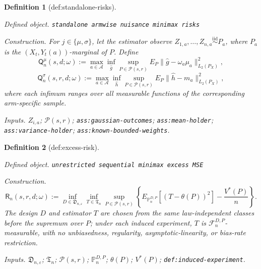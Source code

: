 \documentclass{article}
\newtheorem{definition}{Definition}
\begin{document}
\begin{definition}[def:standalone-risks]\label{def:standalone-risks}
\par\smallskip\noindent\emph{Defined object.} \texttt{standalone armwise nuisance minimax risks}
\par\smallskip\noindent\emph{Construction.} For \(j\in\{\mu,\sigma\}\), let the estimator observe \(Z_{1,a},\ldots,Z_{n,a}\stackrel{\mathrm{iid}}{\sim}P_a\), where \(P_a\) is the \((X_t,Y_t(a))\)-marginal of \(P\). Define \[\mathsf Q_n^{\mu}(s,d;\omega):=\max_{a\in\mathcal A}\inf_{\widehat g}\sup_{P\in\mathcal P(s,r)}E_P\|\widehat g-\omega_a\mu_a\|_{L_2(P_X)}^2,\] \[\mathsf Q_n^{\sigma}(s,r,d;\omega):=\max_{a\in\mathcal A}\inf_{\widehat h}\sup_{P\in\mathcal P(s,r)}E_P\|\widehat h-m_a\|_{L_2(P_X)}^2,\] where each infimum ranges over all measurable functions of the corresponding arm-specific sample.
\par\smallskip\noindent\emph{Inputs.} \(Z_{i,a}\); \(\mathcal P(s,r)\); \texttt{ass:\allowbreak{}gaussian-\allowbreak{}outcomes}; \texttt{ass:\allowbreak{}mean-\allowbreak{}holder}; \texttt{ass:\allowbreak{}variance-\allowbreak{}holder}; \texttt{ass:\allowbreak{}known-\allowbreak{}bounded-\allowbreak{}weights}.
\end{definition}

\begin{definition}[def:excess-risk]\label{def:excess-risk}
\par\smallskip\noindent\emph{Defined object.} \texttt{unrestricted sequential minimax excess MSE}
\par\smallskip\noindent\emph{Construction.} \[\mathsf R_n(s,r,d;\omega):=\inf_{D\in\mathfrak D_{n,\varepsilon}}\inf_{T\in\mathfrak T_n}\sup_{P\in\mathcal P(s,r)}\left\{E_{\mathbb P_n^{D,P}}[(T-\theta(P))^2]-\frac{V^*(P)}{n}\right\}.\] The design \(D\) and estimator \(T\) are chosen from the same law-independent classes before the supremum over \(P\); under each induced experiment, \(T\) is \(\mathcal F_n^{D,P}\)-measurable, with no unbiasedness, regularity, asymptotic-linearity, or bias-rate restriction.
\par\smallskip\noindent\emph{Inputs.} \(\mathfrak D_{n,\varepsilon}\); \(\mathfrak T_n\); \(\mathcal P(s,r)\); \(\mathbb P_n^{D,P}\); \(\theta(P)\); \(V^*(P)\); \texttt{def:\allowbreak{}induced-\allowbreak{}experiment}.
\end{definition}
\end{document}
